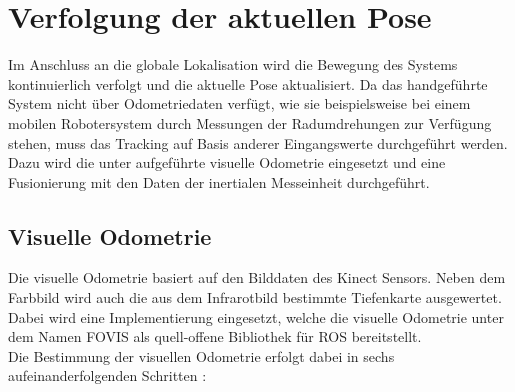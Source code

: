 


\section{Verfolgung der aktuellen Pose}
\label{locloc}
Im Anschluss an die globale Lokalisation wird die Bewegung des Systems kontinuierlich verfolgt und die aktuelle Pose aktualisiert. Da das handgeführte System nicht über Odometriedaten verfügt, wie sie beispielsweise bei einem mobilen Robotersystem durch Messungen der Radumdrehungen zur Verfügung stehen, muss das Tracking auf Basis anderer Eingangswerte durchgeführt werden. Dazu wird die unter  aufgeführte visuelle Odometrie eingesetzt und eine Fusionierung mit den Daten der inertialen Messeinheit durchgeführt.\\

\subsection{Visuelle Odometrie}
Die visuelle Odometrie basiert auf den Bilddaten des Kinect Sensors. Neben dem Farbbild wird auch die aus dem Infrarotbild bestimmte Tiefenkarte ausgewertet. Dabei wird eine Implementierung \cite{Fovis} eingesetzt, welche die visuelle Odometrie unter dem Namen FOVIS als quell-offene Bibliothek für ROS bereitstellt.\\
Die Bestimmung der visuellen Odometrie erfolgt dabei in sechs aufeinanderfolgenden Schritten \cite{Huang2011}:

